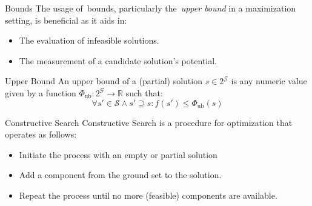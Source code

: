 \begin{frame}{Bounds}
  The usage of~\alert{bounds}, particularly the~\emph{upper bound} in a maximization setting,
  is beneficial as it aids in:

  \begin{itemize}
    \item The evaluation of infeasible solutions.
    \item The measurement of a candidate solution's potential.
  \end{itemize}

  \begin{block}{Upper Bound}
    An upper bound of a (partial) solution $s \in 2^\mathcal{G}$ is any numeric
    value given by a function $\Phi_\text{ub}\colon 2^{\mathcal{G}} \rightarrow
      \mathbb{R} $ such that:
    \begin{equation*}
      \forall s' \in \mathcal{S} \land s' \supseteq s \colon f(s') \le \Phi_\text{ub}(s)
    \end{equation*}
  \end{block}
\end{frame}

\begin{frame}[fragile]{Constructive Search}
  \alert{Constructive Search} is a procedure for optimization that operates as follows:

  \begin{itemize}
    \item Initiate the process with an empty or partial solution
    \item Add a component from the ground set to the solution.
    \item Repeat the process until no more (feasible) components are available.
  \end{itemize}

  \begin{center}
  \end{center}
\end{frame}


